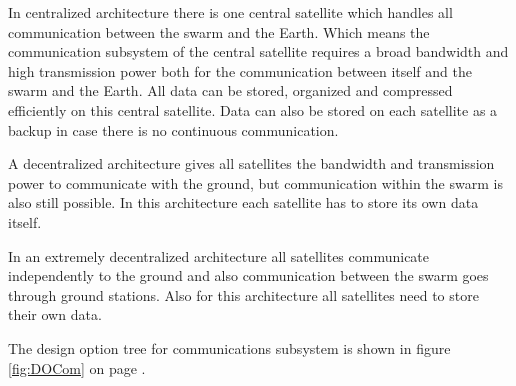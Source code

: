 In centralized architecture there is one central satellite which handles all communication between the swarm and the Earth. Which means the communication subsystem of the central satellite requires a broad bandwidth and high transmission power both for the communication between itself and the swarm and the Earth. All data can be stored, organized and compressed efficiently on this central satellite. Data can also be stored on each satellite as a backup in case there is no continuous communication.

A decentralized architecture gives all satellites the bandwidth and transmission power to communicate with the ground, but communication within the swarm is also still possible. In this architecture each satellite has to store its own data itself.

In an extremely decentralized architecture all satellites communicate independently to the ground and also communication between the swarm goes through ground stations. Also for this architecture all satellites need to store their own data.

The design option tree for communications subsystem is shown in figure \ref{fig:DOCom} on page \pageref{fig:DOCom}.
